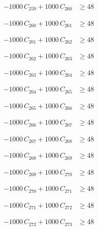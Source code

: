 \documentclass[a4paper,11pt]{article}
\begin{document}
\begin{align}
-1000\,C_{259} + 1000\,C_{260} &\geq 48 \nonumber
\end{align}

\begin{align}
-1000\,C_{260} + 1000\,C_{261} &\geq 48 \nonumber
\end{align}

\begin{align}
-1000\,C_{261} + 1000\,C_{262} &\geq 48 \nonumber
\end{align}

\begin{align}
-1000\,C_{262} + 1000\,C_{263} &\geq 48 \nonumber
\end{align}

\begin{align}
-1000\,C_{263} + 1000\,C_{264} &\geq 48 \nonumber
\end{align}

\begin{align}
-1000\,C_{264} + 1000\,C_{265} &\geq 48 \nonumber
\end{align}

\begin{align}
-1000\,C_{265} + 1000\,C_{266} &\geq 48 \nonumber
\end{align}

\begin{align}
-1000\,C_{266} + 1000\,C_{267} &\geq 48 \nonumber
\end{align}

\begin{align}
-1000\,C_{267} + 1000\,C_{268} &\geq 48 \nonumber
\end{align}

\begin{align}
-1000\,C_{268} + 1000\,C_{269} &\geq 48 \nonumber
\end{align}

\begin{align}
-1000\,C_{269} + 1000\,C_{270} &\geq 48 \nonumber
\end{align}

\begin{align}
-1000\,C_{270} + 1000\,C_{271} &\geq 48 \nonumber
\end{align}

\begin{align}
-1000\,C_{271} + 1000\,C_{272} &\geq 48 \nonumber
\end{align}

\begin{align}
-1000\,C_{272} + 1000\,C_{273} &\geq 48 \nonumber
\end{align}
\end{document}
